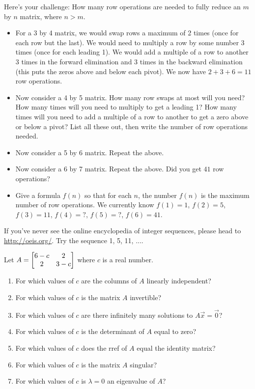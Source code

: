 \begin{problem}
Here's your challenge:  How many row operations are needed to fully reduce an $m$ by $n$ matrix, where $n>m$.
\begin{itemize}
 \item For a 3 by 4 matrix, we would swap rows a maximum of 2 times (once for each row but the last).  We would need to multiply a row by some number 3 times (once for each leading 1). We would add a multiple of a row to another 3 times in the forward elimination and 3 times in the backward elimination (this puts the zeros above and below each pivot). We now have $2+3+6 = 11$ row operations.
 \item Now consider a 4 by 5 matrix. How many row swaps at most will you need?  How many times will you need to multiply to get a leading 1?  How many times will you need to add a multiple of a row to another to get a zero above or below a pivot?  List all these out, then write the number of row operations needed.
 \item Now consider a 5 by 6 matrix. Repeat the above.
 \item Now consider a 6 by 7 matrix. Repeat the above. Did you get $41$ row operations?
 \item Give a formula $f(n)$ so that for each $n$, the number $f(n)$ is the maximum number of row operations. We currently know $f(1)=1$, $f(2)=5$, $f(3)=11$, $f(4)=?$, $f(5)=?$, $f(6)=41$. 
\end{itemize}
If you've never see the online encyclopedia of integer sequences, please head to \href{http://oeis.org/}{http://oeis.org/}. Try the sequence 1, 5, 11, ....  
\end{problem}




\begin{problem}
Let $A=\begin{bmatrix} 6-c&2\\2&3-c \end{bmatrix}$ where $c$ is a real number.
\begin{enumerate}
 \item For which values of $c$ are the columns of $A$ linearly independent?
 \item For which values of $c$ is the matrix $A$ invertible?
 \item For which values of $c$ are there infinitely many solutions to $A\vec x = \vec 0$?
 \item For which values of $c$ is the determinant of $A$ equal to zero?
 \item For which values of $c$ does the rref of $A$ equal the identity matrix?
 \item For which values of $c$ is the matrix $A$ singular?
 \item For which values of $c$ is $\lambda=0$ an eigenvalue of $A$?
\end{enumerate}
\end{problem}


